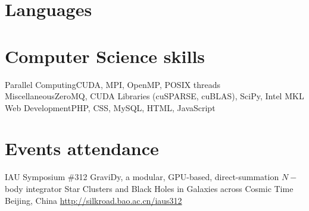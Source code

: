 \documentclass[11pt,a4paper]{moderncv}
\begin{document}
%
%
%
%
%


\section{Languages}

\section{Computer Science skills}
           {Parallel Computing}{CUDA, MPI, OpenMP, POSIX threads}
           {Miscellaneous}{ZeroMQ, CUDA Libraries (cuSPARSE, cuBLAS), SciPy, Intel MKL}
           {Web Development}{PHP, CSS, MySQL, HTML, JavaScript}

\section{Events attendance}
        {IAU Symposium \#312}
        {GraviDy, a modular, GPU-based, direct-summation $N-$body integrator}
        {Star Clusters and Black Holes in Galaxies across Cosmic Time}
        {Beijing, China}
        {\url{http://silkroad.bao.ac.cn/iaus312}}
\end{document}
